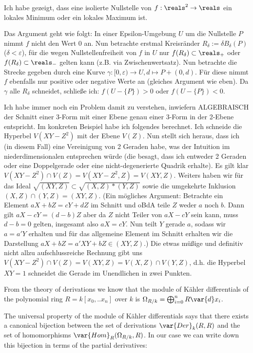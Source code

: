 
Ich habe gezeigt, dass eine isolierte Nullstelle von $f : \reals^2 \to \reals$ ein lokales Minimum oder ein lokales Maximum ist.

Das Argument geht wie folgt: In einer Epsilon-Umgebung $U$ um die Nullstelle $P$ nimmt $f$ nicht den Wert 0 an. Nun betrachte erstmal Kreisränder $R_\delta := \delta B_\delta(P)$ ($\delta < \varepsilon$), für die wegen Nullstellenfreiheit von $f$ in $U$ nur $f(R_\delta) \subset \reals_+$ oder $f(R_\delta) \subset \reals_-$ gelten kann (z.B. via Zwischenwertsatz).
Nun betrachte die Strecke gegeben durch eine Kurve $\gamma : [0,\varepsilon)  \to U, d \mapsto P + (0,d)$. Für diese nimmt $f$ ebenfalls nur positive oder negative Werte an (gleiches Argument wie eben). Da $\gamma$ alle $R_\delta$ schneidet, schließe ich: $f(U - \{ P \}) > 0$ oder $f(U- \{P \}) < 0$.

Ich habe immer noch ein Problem damit zu verstehen, inwiefern ALGEBRAISCH der Schnitt einer 3-Form mit einer Ebene genau einer 3-Form in der 2-Ebene entspricht. Im konkreten Beispiel habe ich folgendes berechnet. Ich schneide die Hyperbel $V(XY-Z^2)$ mit der Ebene $V(Z)$. Nun stellt sich heraus, dass ich (in diesem Fall) eine Vereinigung von 2 Geraden habe, was der Intuition im niederdimensionalen entsprechen würde (die besagt, dass ich entweder 2 Geraden oder eine Doppelgerade oder eine nicht-degenerierte Quadrik erhalte).
Es gilt klar $V(XY-Z^2) \cap V(Z) = V(XY-Z^2,Z) = V(XY,Z)$. Weiters haben wir für das Ideal $\sqrt{(XY,Z)} \subset \sqrt{(X,Z)*(Y,Z)}$ sowie die umgekehrte Inklusion $(X,Z)\cap (Y,Z) = (XY,Z)$. (Ein mögliches Argument: Betrachte ein Element $aX+bZ = cY+dZ$ im Schnitt und oBdA teile $Z$ weder $a$ noch $b$. Dann gilt $aX-cY = (d-b)Z$ aber da $Z$ nicht Teiler von $aX-cY$ sein kann, muss $d-b = 0$ gelten, insgesamt also $aX = cY$. Nun teilt $Y$ gerade $a$, sodass wir $a = a'Y$ erhalten und für das allgemeine Element im Schnitt erhalten wir die Darstellung $aX+bZ = a'XY+bZ \in (XY,Z)$.)
Die etwas müßige und definitiv nicht allzu aufschlussreiche Rechnung gibt uns $V(XY-Z^2) \cap V(Z) = V(XY,Z) = V(X,Z) \cap V(Y,Z)$, d.h. die Hyperbel $XY = 1$ schneidet die Gerade im Unendlichen in zwei Punkten.




From the theory of derivations we know that the module of Kähler differentials of the polynomial ring $R = k[x_0,..x_n]$ over $k$ is $\Omega_{R/k} = \bigoplus_{i=0}^n R\var{d}x_i$.

The universal property of the module of Kähler differentials says that there exists a canonical bijection between the set of derivations $\var{Der}_k(R,R)$ and the set of homomorphisms $\var{Hom}_R(\Omega_{R/k},R)$.
In our case we can write down this bijection in terms of the partial derivatives:

